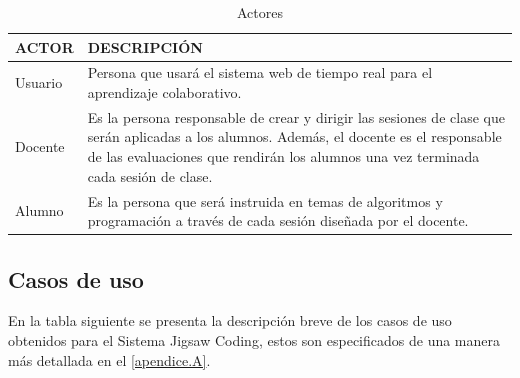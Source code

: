 \begin{longtable}{|L{3cm}|L{7cm}|}
	\caption{Actores}
	\label{tab:das_actores}\\
	\toprule[0.8mm]
	ACTOR & DESCRIPCIÓN \\
	\midrule[0.6mm]
	Usuario & Persona que usará el sistema web de tiempo real para el aprendizaje colaborativo.\\
	\midrule
	Docente & Es la persona responsable de crear y dirigir las sesiones de clase que serán aplicadas a los alumnos. Además, el docente es el responsable de las evaluaciones que rendirán los alumnos una vez terminada cada sesión de clase.\\
	\midrule
	Alumno & Es la persona que será instruida en temas de algoritmos y programación a través de cada sesión diseñada por el docente.\\
	\bottomrule[0.8mm]
\end{longtable}
\subsection{Casos de uso}
En la tabla siguiente se presenta la descripción breve de los casos de uso obtenidos para el Sistema Jigsaw Coding, estos son especificados de una manera más detallada en el \autoref{apendice.A}.\\

